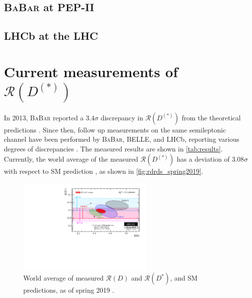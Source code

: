 \documentclass[12pt,letterpaper]{article}
\def\BaBar/{\textsc{BaBar}}
\def\RD/{\ensuremath{\mathcal{R}(D)}}
\def\RDst/{\ensuremath{\mathcal{R}(D^{*})}}
\def\RDDst/{\ensuremath{\mathcal{R}(D^{(*)})}}
\begin{document}
\subsection{\BaBar/ at PEP-II} \label{sec:babar}


\subsection{LHCb at the LHC} \label{sec:lhcb}


\section{Current measurements of \RDDst/}
In 2013, \BaBar/ reported a $3.4\sigma$ discrepancy in \RDDst/ from the
theoretical predictions \cite{Lees:2013rw}.
Since then, follow up measurements on the same semileptonic channel have been
performed by \BaBar/, BELLE, and LHCb, reporting various degrees of
discrepancies \cite{Hirose:2017185, LHCb:PhysRevLett.115.111803, Aaij:2017deq}.
The measured results are shown in \autoref{tab:results}.
Currently, the world average of the measured \RDDst/ has a deviation of
$3.08\sigma$ with respect to SM prediction \cite{HFLAV:2019}, as shown
in \autoref{fig:rdrds_spring2019}.

\begin{figure}[ht]
    \centering
    \includegraphics[width=0.6\textwidth]{figs/rdrds_spring2019.pdf}
    \caption{
        World average of measured \RD/ and \RDst/, and SM predictions, as of
        spring 2019 \cite{HFLAV:2019}.
    }
    \label{fig:rdrds_spring2019}
\end{figure}
\end{document}
